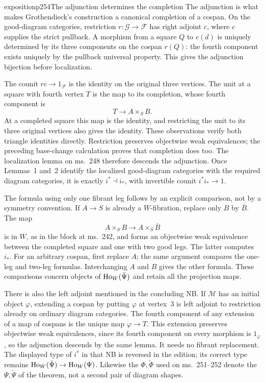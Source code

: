 \begin{dcomment}{exposition}{p254}{The adjunction determines the completion}
The adjunction is what makes Grothendieck's construction a canonical completion of a cospan. On the good-diagram categories, restriction $r:\mathcal G\to\mathcal F$ has right adjoint $c$, where $c$ supplies the strict pullback. A morphism from a square $Q$ to $c(d)$ is uniquely determined by its three components on the cospan $r(Q)$: the fourth component exists uniquely by the pullback universal property. This gives the adjunction bijection before localization.

The counit $rc\to1_{\mathcal F}$ is the identity on the original three vertices. The unit at a square with fourth vertex $T$ is the map to its completion, whose fourth component is
\[
 T\longrightarrow A\times_S B.
\]
At a completed square this map is the identity, and restricting the unit to its three original vertices also gives the identity. These observations verify both triangle identities directly. Restriction preserves objectwise weak equivalences; the preceding base-change calculation proves that completion does too. The localization lemma on ms.~248 therefore descends the adjunction. Once Lemmas~1 and~2 identify the localized good-diagram categories with the required diagram categories, it is exactly $i^*\dashv i_*$, with invertible counit $i^*i_*\to1$.

The formula using only one fibrant leg follows by an explicit comparison, not by a symmetry convention. If $A\to S$ is already a $W$-fibration, replace only $B$ by $\bar B$. The map
\[
 A\times_S B\longrightarrow A\times_S\bar B
\]
is in $W$, as in the block at ms.~242, and forms an objectwise weak equivalence between the completed square and one with two good legs. The latter computes $i_*$. For an arbitrary cospan, first replace $A$; the same argument compares the one-leg and two-leg formulas. Interchanging $A$ and $B$ gives the other formula. These comparisons concern objects of $\mathrm{Ho}_W(\tilde\Psi)$ and retain all the projection maps.

There is also the left adjoint mentioned in the concluding NB. If $\mathcal M$ has an initial object $\varphi$, extending a cospan by putting $\varphi$ at vertex~$3$ is left adjoint to restriction already on ordinary diagram categories. The fourth component of any extension of a map of cospans is the unique map $\varphi\to T$. This extension preserves objectwise weak equivalences, since its fourth component on every morphism is $1_\varphi$, so the adjunction descends by the same lemma. It needs no fibrant replacement. The displayed type of $i^*$ in that NB is reversed in the edition; its correct type remains $\mathrm{Ho}_W(\tilde\Psi)\to\mathrm{Ho}_W(\Psi)$. Likewise the $\Phi,\tilde\Phi$ used on ms.~251--252 denote the $\Psi,\tilde\Psi$ of the theorem, not a second pair of diagram shapes.
\end{dcomment}


